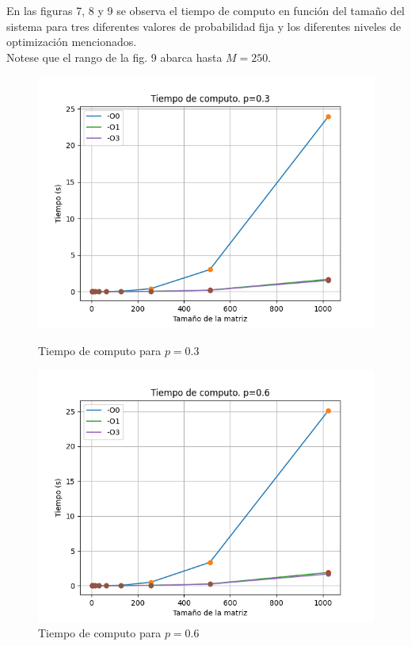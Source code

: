 \documentclass[11pt,twocolumn]{article}
\begin{document}
En las figuras 7, 8 y 9 se observa el tiempo de computo en función del tamaño del sistema para tres diferentes valores de probabilidad fija y los diferentes niveles de optimización mencionados.\\
Notese que el rango de la fig. 9 abarca hasta $M=250$.
\begin{figure}
    \centering
    \includegraphics[width=1\linewidth]{Imagenes/Computing_time_p03.png}
    \caption{Tiempo de computo para $p=0.3$}
    \label{fig:Comptime03}

    \includegraphics[width=1\linewidth]{Imagenes/Computing_time_p06.png}
    \caption{Tiempo de computo para $p=0.6$}
    \label{fig:Comptime06}


\end{figure}
\end{document}
